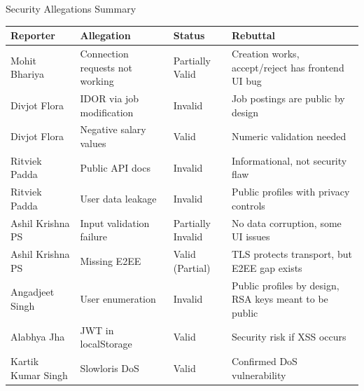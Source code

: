 \documentclass[aspectratio=169]{beamer}
\begin{document}
\begin{frame}[fragile]{Security Allegations Summary}
\renewcommand{\arraystretch}{1.2}
\scriptsize
\begin{tabular}{|p{2.8cm}|p{4cm}|p{1.5cm}|p{5.5cm}|}
\hline
\textbf{Reporter} & \textbf{Allegation} & \textbf{Status} & \textbf{Rebuttal} \\
\hline
Mohit Bhariya & Connection requests not working & Partially Valid & Creation works, accept/reject has frontend UI bug \\
\hline
Divjot Flora & IDOR via job modification & Invalid & Job postings are public by design \\
\hline
Divjot Flora & Negative salary values & Valid & Numeric validation needed \\
\hline
Ritviek Padda & Public API docs & Invalid & Informational, not security flaw \\
\hline
Ritviek Padda & User data leakage & Invalid & Public profiles with privacy controls \\
\hline
Ashil Krishna PS & Input validation failure & Partially Invalid & No data corruption, some UI issues \\
\hline
Ashil Krishna PS & Missing E2EE & Valid (Partial) & TLS protects transport, but E2EE gap exists \\
\hline
Angadjeet Singh & User enumeration & Invalid & Public profiles by design, RSA keys meant to be public \\
\hline
Alabhya Jha & JWT in localStorage & Valid & Security risk if XSS occurs \\
\hline
Kartik Kumar Singh & Slowloris DoS & Valid & Confirmed DoS vulnerability \\
\hline
\end{tabular}
\end{frame}
\end{document}
